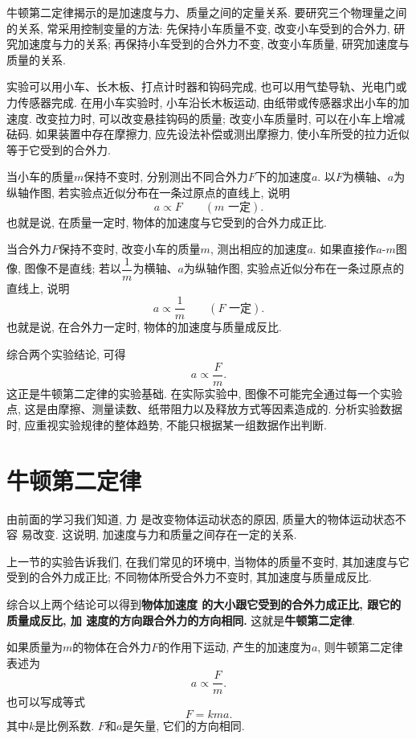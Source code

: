 \documentclass[11pt,a4paper]{ctexbook}
\begin{document}
牛顿第二定律揭示的是加速度与力、质量之间的定量关系. 要研究三个物理量之间的关系, 常采用控制变量的方法:
先保持小车质量不变, 改变小车受到的合外力, 研究加速度与力的关系; 再保持小车受到的合外力不变,
改变小车质量, 研究加速度与质量的关系.

实验可以用小车、长木板、打点计时器和钩码完成, 也可以用气垫导轨、光电门或力传感器完成. 在用小车实验时,
小车沿长木板运动, 由纸带或传感器求出小车的加速度. 改变拉力时, 可以改变悬挂钩码的质量;
改变小车质量时, 可以在小车上增减砝码. 如果装置中存在摩擦力, 应先设法补偿或测出摩擦力,
使小车所受的拉力近似等于它受到的合外力.

当小车的质量$m$保持不变时, 分别测出不同合外力$F$下的加速度$a$. 以$F$为横轴、$a$为纵轴作图,
若实验点近似分布在一条过原点的直线上, 说明
$$a\propto F\qquad (m\text{ 一定}).$$
也就是说, 在质量一定时, 物体的加速度与它受到的合外力成正比.

当合外力$F$保持不变时, 改变小车的质量$m$, 测出相应的加速度$a$. 如果直接作$a$-$m$图像,
图像不是直线; 若以$\dfrac{1}{m}$为横轴、$a$为纵轴作图, 实验点近似分布在一条过原点的直线上, 说明
$$a\propto \frac{1}{m}\qquad (F\text{ 一定}).$$
也就是说, 在合外力一定时, 物体的加速度与质量成反比.

综合两个实验结论, 可得
$$a\propto \frac{F}{m}.$$
这正是牛顿第二定律的实验基础. 在实际实验中, 图像不可能完全通过每一个实验点, 这是由摩擦、测量读数、纸带阻力以及释放方式等因素造成的.
分析实验数据时, 应重视实验规律的整体趋势, 不能只根据某一组数据作出判断.

\section{牛顿第二定律}
由前面的学习我们知道, 力
是改变物体运动状态的原因, 质量大的物体运动状态不容
易改变. 这说明, 加速度与力和质量之间存在一定的关系.

上一节的实验告诉我们, 在我们常见的环境中, 当物体的质量不变时, 其加速度与它受到的合外力成正比;
不同物体所受合外力不变时, 其加速度与质量成反比.

综合以上两个结论可以得到\textbf{物体加速度
的大小跟它受到的合外力成正比, 跟它的质量成反比, 加
速度的方向跟合外力的方向相同. }这就是\textbf{牛顿第二定律}.

如果质量为$m$的物体在合外力$F$的作用下运动, 产生的加速度为$a$, 则牛顿第二定律表述为
$$a \propto \frac{F}{m}.$$
也可以写成等式
\begin{equation}
    F = kma.
    \label{牛顿2}
\end{equation}
其中$k$是比例系数. $F$和$a$是矢量, 它们的方向相同.
\end{document}
